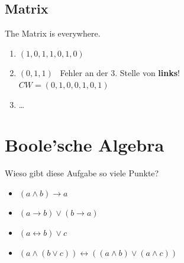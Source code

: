 \documentclass[aspectratio=169,usepdftitle=true,11pt,ngerman,t]{beamer}
\begin{document}
\subsection{Matrix}

\begin{frame}{The Matrix is everywhere.}\onslide<+->
    \begin{solve}
        \begin{enumerate}[\alph*)]%
            \item<+-> \((1,0,1,1,0,1,0)\)
            \item<+-> \((0,1,1)\) \faAngleRight~Fehler an der 3. Stelle von \textbf{links}!\onslide<+->\\
                \(CW = (0,1,0,0,1,0,1)\)
            \item<+-> \dots
        \end{enumerate}
    \end{solve}
\end{frame}
\addtocounter{exercise}{1}

\section{Boole'sche Algebra}

\begin{frame}{Wieso gibt diese Aufgabe so viele Punkte?}\onslide<+->
    \pause%
    \begin{solve}
        \begin{itemize}[<+->]
            \item \((a\wedge b)\rightarrow a\)
            \item \((a\rightarrow b) \vee (b\rightarrow a)\)
            \item \((a\leftrightarrow b) \vee c\)
            \item \((a\wedge(b\vee c))\leftrightarrow ((a\wedge b)\vee(a\wedge c))\)
        \end{itemize}
    \end{solve}
\end{frame}
\resetframecounters%
\end{document}
